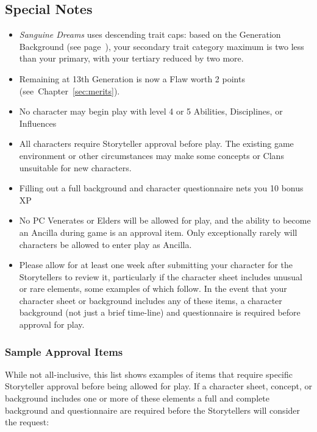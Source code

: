 \subsection{Special Notes}
\begin{itemize}
	\item \emph{Sanguine Dreams} uses descending trait caps:  based on the Generation Background 
	(see page~\pageref{bg:generation}), your secondary trait category maximum is two less than your 
	primary, with your tertiary reduced by two more.
	\item Remaining at 13th Generation is now a Flaw worth 2 points (see~Chapter~\ref{sec:merits}).
	\item No character may begin play with level 4 or 5 Abilities, Disciplines, or Influences
	\item All characters require Storyteller approval before play.  The existing game environment or 
	other circumstances may make some concepts or Clans unsuitable for new characters.
	\item Filling out a full background and character questionnaire nets you 10 bonus XP
	\item No PC Venerates or Elders will be allowed for play, and the ability to become an Ancilla 
	during game is an approval item. Only exceptionally rarely will characters be allowed to enter play 
	as Ancilla.
	\item Please allow for at least one week after submitting your character for the Storytellers to 
	review it, particularly if the character sheet includes unusual or rare elements, some examples 
	of which follow.  In the event that your character sheet or background includes any of these 
	items, a character background (not just a brief time-line) and questionnaire is required before 
	approval for play.
\end{itemize}

\subsubsection{Sample Approval Items}
While not all-inclusive, this list shows examples of items that require specific Storyteller approval before 
being allowed for play.  If a character sheet, concept, or background includes one or more of these elements 
a full and complete background and questionnaire are required before the Storytellers will consider the request:

